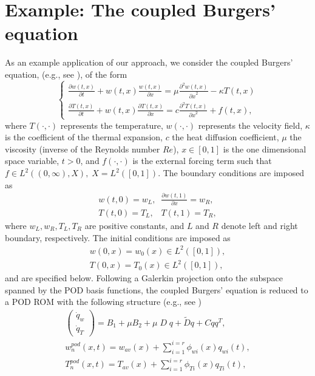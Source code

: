 \documentclass[letterpaper,conference,onecolumn,11pt]{IEEEtran}
\begin{document}
\section{Example: The coupled Burgers' equation}
\label{Burgers-example}
As an example application of our approach, we consider the coupled
Burgers' equation, (e.g., see \cite{B_master_011}), of the form
\begin{equation}\label{Burgers2_chap3}
\left\{\begin{array}{l} \frac{\partial w(t,x)}{\partial
t}+w(t,x)\frac{w(t,x)}{\partial
x}=\mu\frac{\partial^{2}w(t,x)}{{\partial x}^{2}}-\kappa
T(t,x)\\
\frac{\partial T(t,x)}{\partial t}+w(t,x)\frac{\partial
T(t,x)}{\partial x}=c\frac{\partial^{2}T(t,x)}{{\partial
x}^{2}}+f(t,x),
\end{array}\right.
\end{equation}
where $T(\cdot,\cdot)$ represents the temperature,
$w(\cdot,\cdot)$ represents the velocity field, $\kappa$ is the
coefficient of the thermal expansion, $c$ the heat diffusion
coefficient, $\mu$ the viscosity (inverse of the Reynolds number
$Re$), $x\in[0,1]$ is the one dimensional space variable, $t>0$,
and $f(\cdot,\cdot)$ is the external forcing term such that $f\in
L^{2}((0,\infty),X),\;X=L^{2}([0,1])$. The boundary conditions are
imposed as
\begin{equation}\label{boundarycd1_chap3}
\begin{array}{l} w(t,0)=w_L,\;\;\frac{\partial w(t,1)}{\partial x}=w_R,\\
T(t,0)=T_L,\;\;\;T(t,1)=T_R,
\end{array}
\end{equation}
where $w_L, w_R, T_L,T_R$ are positive constants, and $L$ and $R$
denote left and right boundary, respectively. The initial conditions
are imposed as
\begin{equation}\label{initialcd1_chap3}
\begin{array}{l}
w(0,x)=w_{0}(x)\in L^{2}([0,1]),\\
T(0,x)=T_{0}(x)\in L^{2}([0,1]),
\end{array}
\end{equation}
and are specified below. Following a Galerkin projection onto the
subspace spanned by the POD basis functions, the coupled Burgers'
equation is reduced to a POD ROM with the following structure (e.g.,
see \cite{B_master_011})
\begin{equation}\label{Bur-PODROM2-CHAP3}
\begin{array}{l}
\left(\begin{array}{l}
{{\dot{q}}_{w}}\\{{\dot{q}}_{T}}
\end{array}\right)
=B_{1}+\mu B_{2}+\mu\;D\;q+\tilde{D}q+Cq{q}^{T},\\
w^{pod}_{n}(x,t)=w_{av}(x)+\sum_{i=1}^{i=r}\phi_{wi}(x)q_{w i}(t),\\
T^{pod}_{n}(x,t)=T_{av}(x)+\sum_{i=1}^{i=r}\phi_{Ti}(x)q_{T i}(t),
\end{array}
\end{equation}
\end{document}
